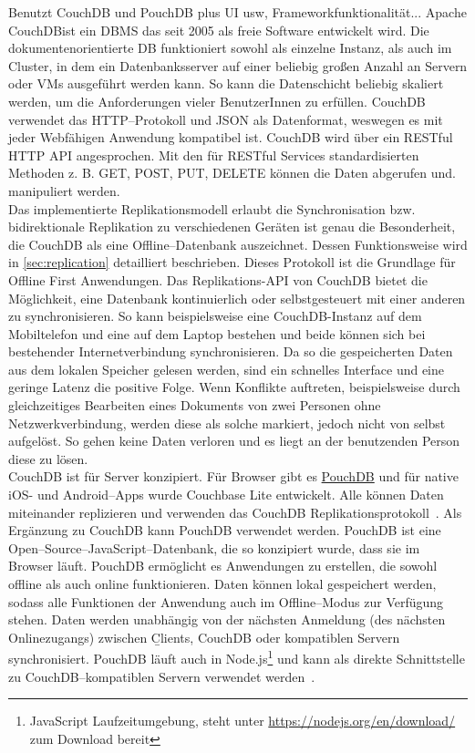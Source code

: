Benutzt CouchDB und PouchDB plus UI usw, Frameworkfunktionalität...\cite{hoodie}
%
%
Apache CouchDB\tm ist ein \gls{DBMS} das seit 2005 als freie Software entwickelt wird. Die dokumentenorientierte \gls{DB} funktioniert sowohl als einzelne Instanz, als auch im Cluster, in dem ein Datenbanksserver auf einer beliebig großen Anzahl an Servern oder \glspl{VM} ausgeführt werden kann. So kann die Datenschicht beliebig skaliert werden, um die Anforderungen vieler BenutzerInnen zu erfüllen. CouchDB verwendet das HTTP--Protokoll und \gls{JSON} als Datenformat, weswegen es mit jeder Webfähigen Anwendung kompatibel ist. CouchDB wird über ein \gls{REST}ful \gls{HTTP} \gls{API} angesprochen. Mit den für \gls{REST}ful Services standardisierten Methoden z. B. GET, POST, PUT, DELETE können die Daten abgerufen und. manipuliert werden.\\
Das implementierte Replikationsmodell erlaubt die Synchronisation bzw. bidirektionale Replikation zu verschiedenen Geräten ist genau die Besonderheit, die CouchDB als eine Offline--Datenbank auszeichnet. Dessen Funktionsweise wird in \autoref{sec:replication} detailliert beschrieben. Dieses Protokoll ist die Grundlage für Offline First Anwendungen.
Das Replikations-API von CouchDB bietet die Möglichkeit, eine Datenbank kontinuierlich oder selbstgesteuert mit einer anderen zu synchronisieren.
So kann beispielsweise eine CouchDB-Instanz auf dem Mobiltelefon und eine auf dem Laptop bestehen und beide können sich bei bestehender Internetverbindung synchronisieren. Da so die gespeicherten Daten aus dem lokalen Speicher gelesen werden, sind ein schnelles Interface und eine geringe Latenz die positive Folge. Wenn Konflikte auftreten, beispielsweise durch gleichzeitiges Bearbeiten eines Dokuments von zwei Personen ohne Netzwerkverbindung, werden diese als solche markiert, jedoch nicht von selbst aufgelöst. So gehen keine Daten verloren und es liegt an der benutzenden Person diese zu lösen. \\
CouchDB ist für Server konzipiert. Für Browser gibt es \hyperref[sub:pouch]{PouchDB} und für native iOS- und Android--\glspl{App} wurde Couchbase Lite entwickelt. Alle können Daten miteinander replizieren und verwenden das CouchDB Replikationsprotokoll~\cite{couch}.
%
%
Als Ergänzung zu CouchDB kann PouchDB verwendet werden. PouchDB ist eine Open--Source--JavaScript--Datenbank, die so konzipiert wurde, dass sie im Browser läuft. PouchDB ermöglicht es Anwendungen zu erstellen, die sowohl offline als auch online funktionieren. Daten können lokal gespeichert werden, sodass alle Funktionen der Anwendung auch im Offline--Modus zur Verfügung stehen.
Daten werden unabhängig von der nächsten Anmeldung (des nächsten Onlinezugangs) zwischen \b{Clients}, CouchDB oder kompatiblen Servern synchronisiert.
PouchDB läuft auch in Node.js\footnote{JavaScript Laufzeitumgebung, steht unter \url{https://nodejs.org/en/download/} zum Download bereit} und kann als direkte Schnittstelle zu CouchDB--kompatiblen Servern verwendet werden~\cite{pouch}.
